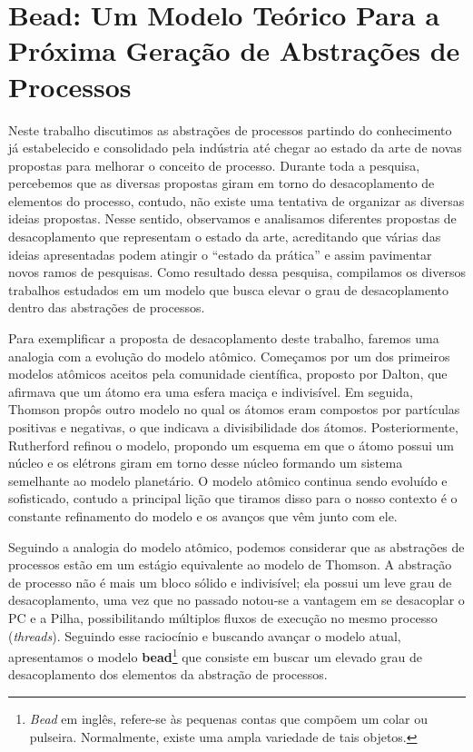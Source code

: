 \section{Bead: Um Modelo Teórico Para a Próxima Geração de Abstrações de Processos}
\label{sec:bead}

Neste trabalho discutimos as abstrações de processos partindo do conhecimento
já estabelecido e consolidado pela indústria até chegar ao estado da arte de
novas propostas para melhorar o conceito de processo. Durante toda a pesquisa,
percebemos que as diversas propostas giram em torno do desacoplamento de
elementos do processo, contudo, não existe uma tentativa de organizar as
diversas ideias propostas. Nesse sentido, observamos e analisamos diferentes propostas de
desacoplamento que representam o estado da arte, acreditando que várias
das ideias apresentadas podem atingir o ``estado da prática'' e assim pavimentar
novos ramos de pesquisas. Como resultado dessa pesquisa, compilamos os diversos
trabalhos estudados em um modelo que busca elevar o grau de desacoplamento
dentro das abstrações de processos.

Para exemplificar a proposta de desacoplamento deste trabalho, faremos uma
analogia com a evolução do modelo atômico. Começamos por um dos primeiros
modelos atômicos aceitos pela comunidade científica, proposto por Dalton, que
afirmava que um átomo era uma esfera maciça e indivisível. Em seguida, Thomson
propôs outro modelo no qual os átomos eram compostos por partículas positivas e
negativas, o que indicava a divisibilidade dos átomos. Posteriormente, Rutherford
refinou o modelo, propondo um esquema em que o átomo possui um núcleo e os
elétrons giram em torno desse núcleo formando um sistema semelhante ao modelo
planetário. O modelo atômico continua sendo evoluído e sofisticado, contudo a principal lição que tiramos disso para o nosso contexto é o
constante refinamento do modelo e os avanços que vêm junto com ele.

Seguindo a analogia do modelo atômico, podemos considerar que as abstrações de
processos estão em um estágio equivalente ao modelo de Thomson. A abstração de
processo não é mais um bloco sólido e indivisível; ela possui um leve grau de
desacoplamento, uma vez que no passado notou-se a vantagem em se desacoplar o PC
e a Pilha, possibilitando múltiplos fluxos de execução no mesmo processo
(\emph{threads}). Seguindo esse raciocínio e buscando avançar o modelo atual,
apresentamos o modelo \textbf{bead}\footnote{\emph{Bead} em inglês,
refere-se às pequenas contas que compõem um colar ou pulseira. Normalmente,
existe uma ampla variedade de tais objetos.} que consiste em buscar um elevado
grau de desacoplamento dos elementos da abstração de processos.


